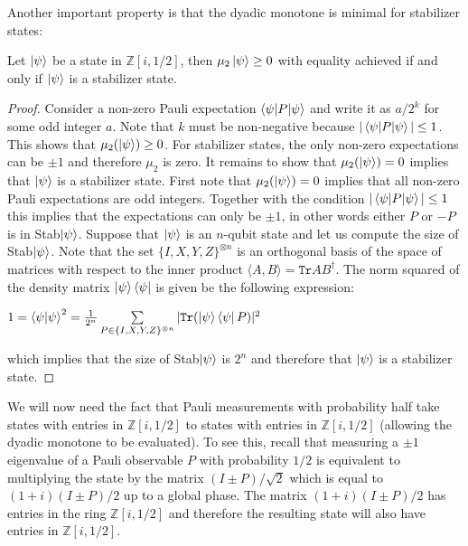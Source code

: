 \documentclass[12pt]{dalthesis}
\begin{document}
Another important property is that the dyadic monotone is minimal for stabilizer states:
\begin{proposition}
Let $\ket{\psi}$ be a state in $\mathbb{Z}[i, 1/2]$, then $\mu_2 \ket{\psi} \geq 0$ with equality achieved if and only if $\ket{\psi}$ is a stabilizer state.
\end{proposition}
\begin{proof}
Consider a non-zero Pauli expectation $\braket{\psi |P| \psi}$ and write it as $a/2^k$ for some odd integer $a$. Note that $k$ must be non-negative because $|\braket{\psi |P| \psi}| \leq 1$. This shows that $\mu_2 (\ket{\psi}) \geq 0$. For stabilizer states, the only non-zero expectations can be $\pm 1$ and therefore $\mu_2$ is zero. It remains to show that $\mu_2 (\ket{\psi}) = 0$ implies that $\ket{\psi}$ is a stabilizer state. First note that $\mu_2 (\ket{\psi}) = 0$ implies that all non-zero Pauli expectations are odd integers. Together with the condition $|\braket{\psi |P| \psi}| \leq 1$ this implies that the expectations can only be $\pm 1$, in other words either $P$ or $-P$ is in Stab$\ket{\psi}$. Suppose that $\ket{\psi}$ is an $n$-qubit state and let us compute the size of Stab$\ket{\psi}$. Note that the set $\{ I, X, Y, Z \}^{\otimes n}$ is an orthogonal basis of the space of matrices with respect to the inner product $\langle A, B \rangle = \texttt{Tr} AB^{\dag}$. The norm squared of the density matrix $\ket{\psi} \bra{\psi}$ is given be the following expression:
\begin{center}
$1 = \braket{\psi | \psi}^2 = \frac{1}{2^n} \sum\limits_{P \in \{ I, X, Y, Z \}^{\otimes n}} |\texttt{Tr}(\ket{\psi}\bra{\psi}P)|^2$
\end{center}
which implies that the size of Stab$\ket{\psi}$ is $2^n$ and therefore that $\ket{\psi}$ is a stabilizer state.
\end{proof}

We will now need the fact that Pauli measurements with probability half take states with entries in $\mathbb{Z}[i, 1/2]$ to states with entries in $\mathbb{Z}[i, 1/2]$ (allowing the dyadic monotone to be evaluated). To see this, recall that measuring a $\pm 1$ eigenvalue of a Pauli observable $P$ with probability $1/2$ is equivalent to multiplying the state by the matrix $(I \pm P)/\sqrt{2}$ which is equal to $(1 + i)(I \pm P)/2$ up to a global phase. The matrix $(1 + i)(I \pm P)/2$ has entries in the ring $\mathbb{Z}[i, 1/2]$ and therefore the resulting state will also have entries in $\mathbb{Z}[i, 1/2]$.
\end{document}
